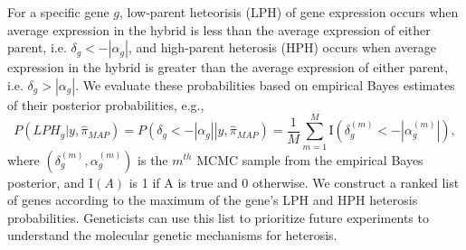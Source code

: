 \documentclass[useAMS,usenatbib,referee]{biom}
\begin{document}
For a specific gene $g$, low-parent heteorisis (LPH) of gene expression occurs when average expression in the hybrid is less than the average expression of either parent, i.e. $\delta_g < -|\alpha_g|$, and high-parent heterosis (HPH) occurs when average expression in the hybrid is greater than the average expression of either parent, i.e. $\delta_g > |\alpha_g|$. 
We evaluate these probabilities based on empirical Bayes estimates of their posterior probabilities, e.g., 
\begin{equation}
P(LPH_g|y,\hat{\pi}_{MAP}) = P\left(\left.\delta_g < -|\alpha_g|\right|y, \hat{\pi}_{MAP}\right) = \frac{1}{M} \sum_{m=1}^M \mathrm{I}\left(\delta_g^{(m)} < -\left|\alpha_g^{(m)}\right|\right), 
\label{e:probs}
\end{equation}
where $\left(\delta_g^{(m)},\alpha_g^{(m)}\right)$ is the $m^{th}$ MCMC sample from the empirical Bayes posterior, and $\mathrm{I}(A)$ is 1 if A is true and 0 otherwise. We construct a ranked list of genes according to the maximum of the gene's LPH and HPH heterosis probabilities. Geneticists can use this list to prioritize future experiments to understand the molecular genetic mechanisms for heterosis.  
 
\end{document}
